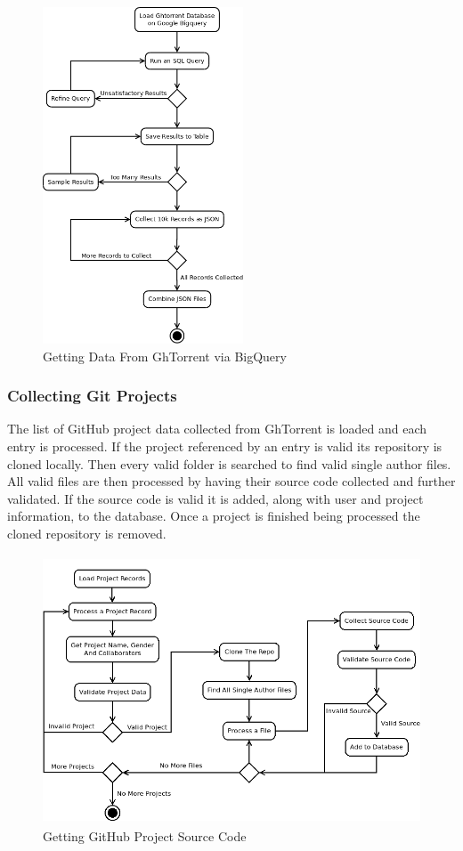 \documentclass[12pt]{article}
\begin{document}
\begin{figure}[t]
    \centering
    \includegraphics[height=10cm]{diagrams/ght_process.png}
    \caption{Getting Data From GhTorrent via BigQuery}
\end{figure}

\subsubsection*{Collecting Git Projects}
The list of GitHub project data collected from GhTorrent is loaded and each entry is processed. If the project referenced by an entry is valid its repository is cloned locally. Then every valid folder is searched to find valid single author files. All valid files are then processed by having their source code collected and further validated. If the source code is valid it is added, along with user and project information, to the database. Once a project is finished being processed the cloned repository is removed.

\begin{figure}[t]
    \centering
    \includegraphics[height=8cm]{diagrams/projects.png}
    \caption{Getting GitHub Project Source Code}
\end{figure}
\end{document}
